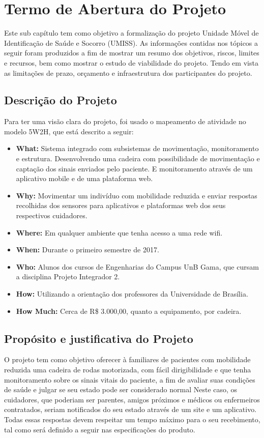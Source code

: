 \section{Termo de Abertura do Projeto}
Este sub capítulo tem como objetivo a formalização do projeto Unidade Móvel de
Identificação de Saúde e Socorro (UMISS). As informações contidas nos tópicos 
a seguir foram produzidos a fim de mostrar um resumo dos objetivos, riscos, 
limites e recursos, bem como mostrar o estudo de viabilidade do projeto. 
Tendo em vista as limitações de prazo, orçamento e infraestrutura dos 
participantes do projeto.
\subsection{Descrição do Projeto}
Para ter uma visão clara do projeto, foi usado o mapeamento de atividade no 
modelo 5W2H, que está descrito a seguir:

\begin{itemize}
    \item \textbf{What:} Sistema integrado com subsistemas de movimentação,
    monitoramento e estrutura. Desenvolvendo uma cadeira com possibilidade
    de movimentação e captação dos sinais enviados pelo paciente. E monitoramento
    através de um aplicativo mobile e de uma plataforma web.
    \item \textbf{Why:} Movimentar um indivíduo com mobilidade reduzida
    e enviar respostas recolhidas
    dos sensores para aplicativos e plataformas web dos seus respectivos
    cuidadores.
    \item \textbf{Where:} Em qualquer ambiente que tenha acesso a uma rede wifi.
    \item \textbf{When:} Durante o primeiro semestre de 2017.
    \item \textbf{Who:} Alunos dos cursos de Engenharias do Campus UnB Gama,
    que cursam a disciplina Projeto Integrador 2.
    \item \textbf{How:} Utilizando a orientação dos professores da Universidade
    de Brasília.
    \item \textbf{How Much:} Cerca de R\$ 3.000,00, quanto a equipamento, por
    cadeira.
\end{itemize}

\subsection{Propósito e justificativa do Projeto}
O projeto tem como objetivo oferecer à familiares de pacientes com mobilidade 
reduzida uma cadeira de rodas motorizada,
com fácil dirigibilidade 
e que tenha monitoramento sobre os sinais vitais do paciente,
a fim de avaliar suas condições de saúde e julgar se seu estado pode ser considerado normal
Neste caso, os cuidadores, que poderiam ser parentes, amigos 
próximos e médicos ou enfermeiros contratados, seriam notificados
do seu estado através de um site e um aplicativo. Todas essas respostas
devem respeitar um tempo máximo para o seu recebimento, tal como será
definido a seguir nas especificações do produto.

